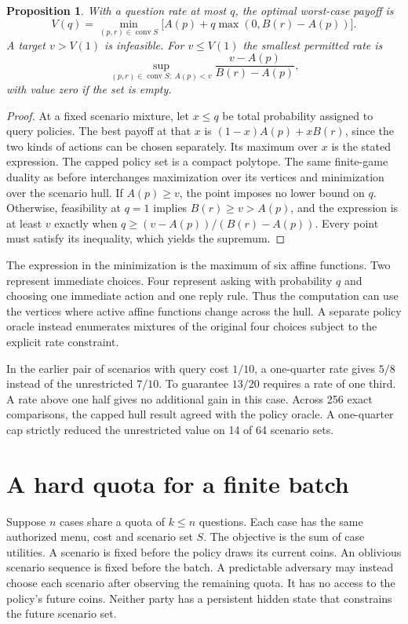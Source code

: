 \documentclass[11pt]{article}
\newtheorem{proposition}{Proposition}
\begin{document}
\begin{proposition}
With a question rate at most $q$, the optimal worst-case payoff is
\[
 V(q)=\min_{(p,r)\in\operatorname{conv}S}
 \bigl[A(p)+q\max(0,B(r)-A(p))\bigr].
\]
A target $v>V(1)$ is infeasible. For $v\le V(1)$ the smallest
permitted rate is
\[
 \sup_{(p,r)\in\operatorname{conv}S:\ A(p)<v}
       \frac{v-A(p)}{B(r)-A(p)},
\]
with value zero if the set is empty.
\end{proposition}
\begin{proof}
At a fixed scenario mixture, let $x\le q$ be total probability
assigned to query policies. The best payoff at that $x$ is
$(1-x)A(p)+xB(r)$, since the two kinds of actions can be chosen
separately. Its maximum over $x$ is the stated expression.
The capped policy set is a compact polytope. The same finite-game
duality as before interchanges maximization over its vertices
and minimization over the scenario hull. If $A(p)\ge v$, the
point imposes no lower bound on $q$. Otherwise, feasibility at
$q=1$ implies $B(r)\ge v>A(p)$, and the expression is at least
$v$ exactly when $q\ge(v-A(p))/(B(r)-A(p))$. Every point must
satisfy its inequality, which yields the supremum.
\end{proof}

The expression in the minimization is the maximum of six affine
functions. Two represent immediate choices. Four represent asking
with probability $q$ and choosing one immediate action and one
reply rule. Thus the computation can use the vertices where
active affine functions change across the hull. A separate policy
oracle instead enumerates mixtures of the original four choices
subject to the explicit rate constraint.

In the earlier pair of scenarios with query cost $1/10$, a
one-quarter rate gives $5/8$ instead of the unrestricted $7/10$.
To guarantee $13/20$ requires a rate of one third. A rate above
one half gives no additional gain in this case. Across 256 exact
comparisons, the capped hull result agreed with the policy oracle.
A one-quarter cap strictly reduced the unrestricted value on 14
of 64 scenario sets.


\section{A hard quota for a finite batch}
Suppose $n$ cases share a quota of $k\le n$ questions. Each case has
the same authorized menu, cost and scenario set $S$. The objective
is the sum of case utilities. A scenario is fixed before the policy
draws its current coins. An oblivious scenario sequence is fixed
before the batch. A predictable adversary may instead choose each
scenario after observing the remaining quota. It has no access to
the policy's future coins. Neither party has a persistent hidden
state that constrains the future scenario set.
\end{document}
